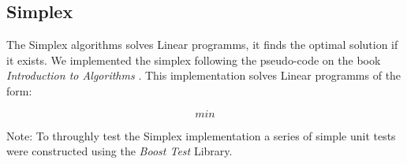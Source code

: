 \subsection{Simplex}
\label{sec:Simplex}

The Simplex algorithms solves Linear programms, it finds the optimal solution if it exists.
We implemented the simplex following the pseudo-code on the book \emph{Introduction to Algorithms} \cite{Cormen}.
This implementation solves Linear programms of the form:

$$ min $$




Note: To throughly test the Simplex implementation a series of simple unit tests were constructed using the \emph{Boost Test} Library.

